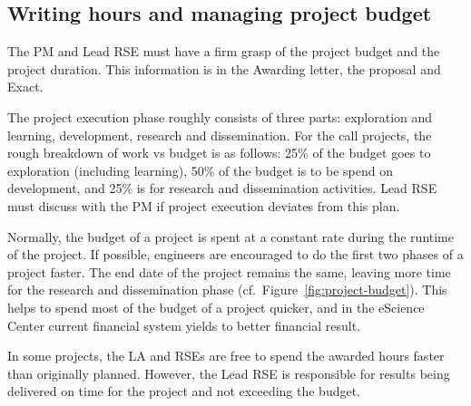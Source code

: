\subsection{Writing hours and managing project budget}
\label{sec:exec:budget}
The PM and Lead RSE must have a firm grasp of the project budget and the project duration. This information is in the
Awarding letter, the proposal and Exact.

The project execution phase roughly consists of three parts: exploration and learning, development, research and dissemination.
For the call projects, the rough breakdown of work vs budget is as follows: 25\% of the budget goes to
exploration (including learning), 50\% of the budget is to be spend on development, and 25\% is for research
and dissemination activities. Lead RSE must discuss with the PM if project execution deviates from this plan.

Normally, the budget of a project is spent at a constant rate during the runtime of the project. 
If possible, engineers are encouraged to do the first two phases of a project faster. The end date of the project 
remains the same, leaving more time for the research and dissemination phase (cf.~Figure~\ref{fig:project-budget}). 
This helps to spend most of the budget of a project quicker, and in the eScience Center current financial system yields 
to better financial result.

In some projects, the LA and RSEs are free to spend the awarded hours faster than originally planned. However, the
Lead RSE is responsible for results being delivered on time for the project and not exceeding the budget.

